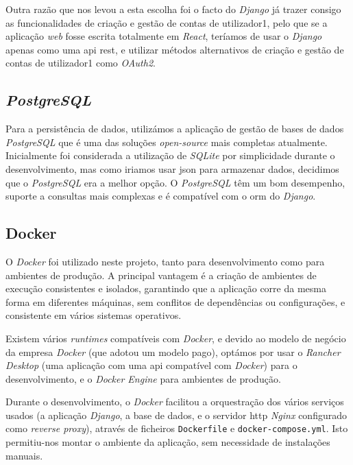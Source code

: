 Outra razão que nos levou a esta escolha foi o facto do \textit{Django} já trazer consigo as funcionalidades de criação e gestão de contas de utilizador1, pelo que se a aplicação \textit{web} fosse escrita totalmente em \textit{React}, teríamos de usar o \textit{Django} apenas como uma \gls{api} \gls{rest}, e utilizar métodos alternativos de criação e gestão de contas de utilizador1 como \textit{OAuth2}.

\subsection{\textit{PostgreSQL}}

Para a persistência de dados, utilizámos a aplicação de gestão de bases de dados \textit{PostgreSQL} que é uma das soluções \textit{open-source} mais completas atualmente. Inicialmente foi considerada a utilização de \textit{SQLite} por simplicidade durante o desenvolvimento, mas como iriamos usar \gls{json} para armazenar dados,  decidimos que o \textit{PostgreSQL} era a melhor opção. O \textit{PostgreSQL} têm um bom desempenho, suporte a consultas mais complexas e é compatível com o \gls{orm} do \textit{Django}.

\subsection{Docker}

O \textit{Docker}\cite{docker} foi utilizado neste projeto, tanto para desenvolvimento como para ambientes de produção. A principal vantagem é a criação de ambientes de execução consistentes e isolados, garantindo que a aplicação corre da mesma forma em diferentes máquinas, sem conflitos de dependências ou configurações, e consistente em vários sistemas operativos. 

Existem vários \textit{runtimes} compatíveis com \textit{Docker}\cite{docker}, e devido ao modelo de negócio da empresa \textit{Docker}\cite{docker} (que adotou um modelo pago), optámos por usar o \textit{Rancher Desktop}\cite{rancherdesktop} (uma aplicação com uma \gls{api} compatível com \textit{Docker}) para o desenvolvimento, e o \textit{Docker Engine}\cite{docker} para ambientes de produção.

Durante o desenvolvimento, o \textit{Docker} facilitou a orquestração dos vários serviços usados (a aplicação \textit{Django}, a base de dados, e o servidor \gls{http} \textit{Nginx} configurado como \textit{reverse proxy}), através de ficheiros \texttt{Dockerfile} e \texttt{docker-compose.yml}. Isto permitiu-nos montar o ambiente da aplicação, sem necessidade de instalações manuais.

